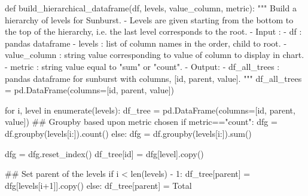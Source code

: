 \documentclass[
  letterpaper,
  DIV=11,
  numbers=noendperiod]{scrartcl}
\newenvironment{Shaded}{\begin{snugshade}}{\end{snugshade}}
\newcommand{\BuiltInTok}[1]{\textcolor[rgb]{0.00,0.23,0.31}{#1}}
\newcommand{\CommentTok}[1]{\textcolor[rgb]{0.37,0.37,0.37}{#1}}
\newcommand{\ControlFlowTok}[1]{\textcolor[rgb]{0.00,0.23,0.31}{#1}}
\newcommand{\DecValTok}[1]{\textcolor[rgb]{0.68,0.00,0.00}{#1}}
\newcommand{\KeywordTok}[1]{\textcolor[rgb]{0.00,0.23,0.31}{#1}}
\newcommand{\NormalTok}[1]{\textcolor[rgb]{0.00,0.23,0.31}{#1}}
\newcommand{\OperatorTok}[1]{\textcolor[rgb]{0.37,0.37,0.37}{#1}}
\newcommand{\StringTok}[1]{\textcolor[rgb]{0.13,0.47,0.30}{#1}}
\begin{document}
\begin{Shaded}
\begin{Highlighting}[]
\KeywordTok{def}\NormalTok{ build\_hierarchical\_dataframe(df, levels, value\_column, metric):}
    \CommentTok{"""}
\CommentTok{    Build a hierarchy of levels for Sunburst.}
\CommentTok{    {-} Levels are given starting from the bottom to the top of the hierarchy,}
\CommentTok{    i.e. the last level corresponds to the root.}
\CommentTok{    {-} Input : }
\CommentTok{        {-} df : pandas dataframe }
\CommentTok{        {-} levels : list of column names in the order, child to root.}
\CommentTok{        {-} value\_column : string value corresponding to value of column to display in chart.}
\CommentTok{        {-} metric : string value equal to "sum" or "count".}
\CommentTok{    {-} Output:}
\CommentTok{        {-} df\_all\_trees : pandas dataframe for sunburst with columns, [\textquotesingle{}id\textquotesingle{}, \textquotesingle{}parent\textquotesingle{}, \textquotesingle{}value\textquotesingle{}].  }
\CommentTok{    """}
\NormalTok{    df\_all\_trees }\OperatorTok{=}\NormalTok{ pd.DataFrame(columns}\OperatorTok{=}\NormalTok{[}\StringTok{\textquotesingle{}id\textquotesingle{}}\NormalTok{, }\StringTok{\textquotesingle{}parent\textquotesingle{}}\NormalTok{, }\StringTok{\textquotesingle{}value\textquotesingle{}}\NormalTok{])}
    
    \ControlFlowTok{for}\NormalTok{ i, level }\KeywordTok{in} \BuiltInTok{enumerate}\NormalTok{(levels):}
\NormalTok{        df\_tree }\OperatorTok{=}\NormalTok{ pd.DataFrame(columns}\OperatorTok{=}\NormalTok{[}\StringTok{\textquotesingle{}id\textquotesingle{}}\NormalTok{, }\StringTok{\textquotesingle{}parent\textquotesingle{}}\NormalTok{, }\StringTok{\textquotesingle{}value\textquotesingle{}}\NormalTok{])}
        \CommentTok{\#\# Groupby based upon metric chosen}
        \ControlFlowTok{if}\NormalTok{ metric}\OperatorTok{==}\StringTok{"count"}\NormalTok{:}
\NormalTok{            dfg }\OperatorTok{=}\NormalTok{ df.groupby(levels[i:]).count()}
        \ControlFlowTok{else}\NormalTok{:}
\NormalTok{            dfg }\OperatorTok{=}\NormalTok{ df.groupby(levels[i:]).}\BuiltInTok{sum}\NormalTok{()}
        
\NormalTok{        dfg }\OperatorTok{=}\NormalTok{ dfg.reset\_index()}
\NormalTok{        df\_tree[}\StringTok{\textquotesingle{}id\textquotesingle{}}\NormalTok{] }\OperatorTok{=}\NormalTok{ dfg[level].copy()}

        \CommentTok{\#\# Set parent of the levels }
        \ControlFlowTok{if}\NormalTok{ i }\OperatorTok{\textless{}} \BuiltInTok{len}\NormalTok{(levels) }\OperatorTok{{-}} \DecValTok{1}\NormalTok{:}
\NormalTok{            df\_tree[}\StringTok{\textquotesingle{}parent\textquotesingle{}}\NormalTok{] }\OperatorTok{=}\NormalTok{ dfg[levels[i}\OperatorTok{+}\DecValTok{1}\NormalTok{]].copy()}
        \ControlFlowTok{else}\NormalTok{:}
\NormalTok{            df\_tree[}\StringTok{\textquotesingle{}parent\textquotesingle{}}\NormalTok{] }\OperatorTok{=} \StringTok{\textquotesingle{}Total\textquotesingle{}}
        

\end{Highlighting}
\end{Shaded}
\end{document}
